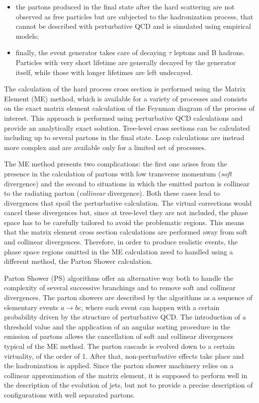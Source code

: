 \begin{itemize}
\item the partons produced in the final state after the hard scattering are not observed as free particles but are subjected to the hadronization process, that cannot be described with perturbative QCD and is simulated using empirical models;

\item finally, the event generator takes care of decaying $\tau$ leptons and B hadrons. Particles with very short lifetime are generally decayed by the generator itself, while those with longer lifetimes are left undecayed.
\end{itemize}

The calculation of the hard process cross section is performed using the Matrix Element (ME) method, which is available for a variety of processes and consists on the exact matrix element calculation of the Feynman diagram of the process of interest. This approach is performed using perturbative QCD calculations and provide an analytically exact solution. Tree-level cross sections can be calculated including up to several partons in the final state. Loop calculations are instead more complex and are available only for a limited set of processes. 

The ME method presents two complications: the first one arises from the presence in the calculation of partons with low transverse momentum (\emph{soft} divergence) and the second to situations in which the emitted parton is collinear to the radiating parton (\emph{collinear} divergence). Both these cases lead to divergences that spoil the perturbative calculation. The virtual corrections would cancel these divergences but, since at tree-level they are not included, the phase space has to be carefully tailored to avoid the problematic regions. This means that the matrix
element cross section calculations are performed away from soft and collinear divergences. Therefore, in order to produce realistic events, the phase space regions omitted in the ME calculation need to handled using a different method, the Parton Shower calculation.

Parton Shower (PS) algorithms offer an alternative way both to handle the complexity of several successive branchings and to remove soft and collinear divergences. The parton showers are described by the algorithms as a sequence of elementary events $a\to bc$, where each event can happen with a certain probability driven by the structure of perturbative QCD. The introduction of a threshold value
and the application of an angular sorting procedure in the emission of partons allows the cancellation of soft and collinear divergences typical of the ME method. The parton cascade is evolved down to a certain virtuality, of the order of 1\GeV. After that, non-perturbative effects take place and the hadronization is applied. Since the parton shower machinery relies on a collinear approximation of the matrix element, it is supposed to perform well in the description of the evolution of jets, but not to provide a precise description of configurations with well separated partons.

